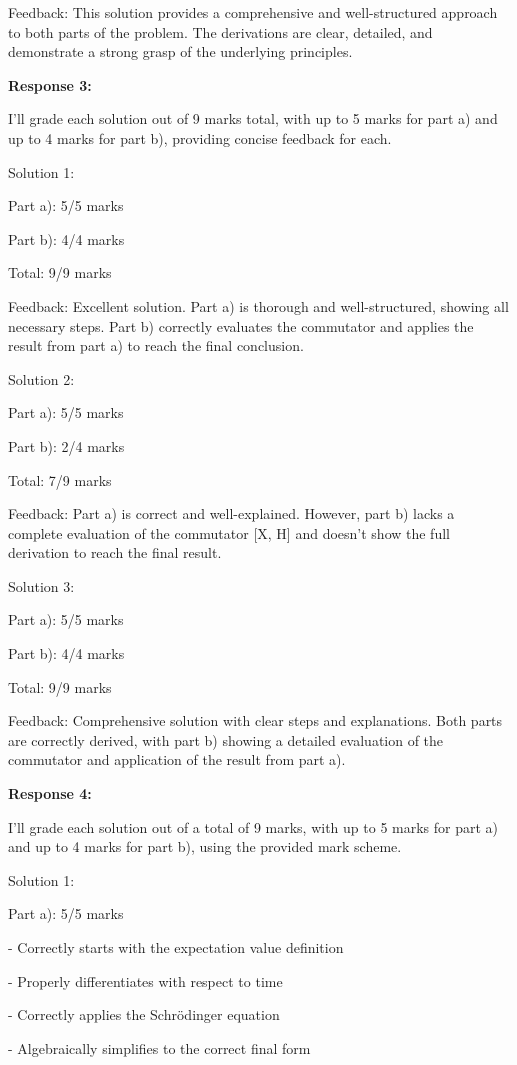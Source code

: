 \documentclass[a4paper,11pt]{article}
\begin{document}
Feedback: This solution provides a comprehensive and well-structured approach to both parts of the problem. The derivations are clear, detailed, and demonstrate a strong grasp of the underlying principles.

\bigskip   
\textbf{Response 3:}

I'll grade each solution out of 9 marks total, with up to 5 marks for part a) and up to 4 marks for part b), providing concise feedback for each.

Solution 1:

Part a): 5/5 marks

Part b): 4/4 marks

Total: 9/9 marks

Feedback: Excellent solution. Part a) is thorough and well-structured, showing all necessary steps. Part b) correctly evaluates the commutator and applies the result from part a) to reach the final conclusion.

Solution 2:

Part a): 5/5 marks

Part b): 2/4 marks

Total: 7/9 marks

Feedback: Part a) is correct and well-explained. However, part b) lacks a complete evaluation of the commutator [X, H] and doesn't show the full derivation to reach the final result.

Solution 3:

Part a): 5/5 marks

Part b): 4/4 marks

Total: 9/9 marks

Feedback: Comprehensive solution with clear steps and explanations. Both parts are correctly derived, with part b) showing a detailed evaluation of the commutator and application of the result from part a).

\bigskip
\textbf{Response 4:}

I'll grade each solution out of a total of 9 marks, with up to 5 marks for part a) and up to 4 marks for part b), using the provided mark scheme.

Solution 1:

Part a): 5/5 marks

- Correctly starts with the expectation value definition

- Properly differentiates with respect to time

- Correctly applies the Schrödinger equation

- Algebraically simplifies to the correct final form
\end{document}
